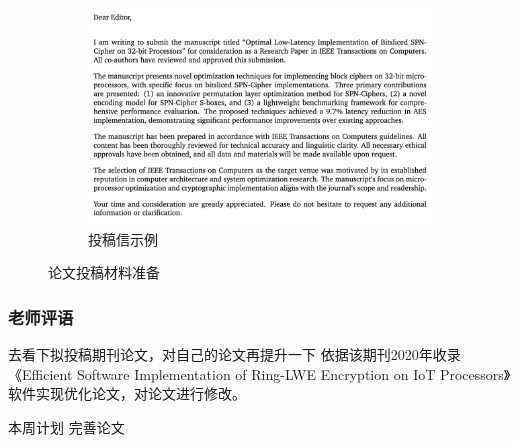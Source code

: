 \documentclass{beamer}
\begin{document}
\begin{frame}
\begin{figure}
\begin{subfigure}[b]{0.45\textwidth}
        \centering
        \includegraphics[width=\textwidth]{./fig/CoverLetter.png}
        \caption{投稿信示例}
        \label{fig:coverletter}
      \end{subfigure}
      \caption{论文投稿材料准备}
      \label{fig:submission_materials}
    \end{figure}
\end{frame}

\begin{frame}
    \frametitle{老师评语}
    \begin{alertblock}{去看下拟投稿期刊论文，对自己的论文再提升一下}
      依据该期刊2020年收录《Efficient Software Implementation of Ring-LWE
      Encryption on IoT Processors》软件实现优化论文，对论文进行修改。
  \end{alertblock}
    \begin{block}{本周计划}
      完善论文
    \end{block}
\end{frame}
\end{document}
